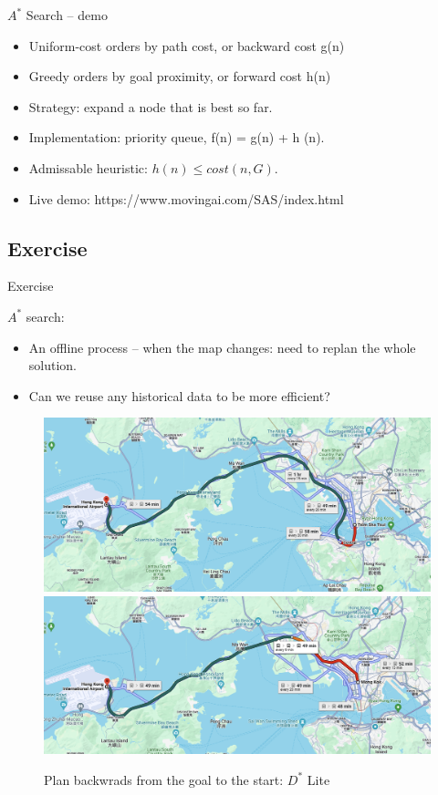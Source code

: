 \documentclass{beamer}
\begin{document}
\begin{frame}{$A^*$ Search -- demo}
\begin{itemize}
    \item Uniform-cost orders by path cost, or backward cost g(n)
    \item Greedy orders by goal proximity, or forward cost h(n)

    \item Strategy: expand a node that is best so far.
    
    \item Implementation: priority queue, f(n) = g(n) + h (n).

    \item Admissable heuristic: $h(n) \leq cost(n, G)$.

    \item \alert{Live demo: https://www.movingai.com/SAS/index.html}
\end{itemize}
\end{frame}




\subsection{Exercise}

\begin{frame}{Exercise}
    \begin{exampleblock}{$A^*$ search:}
        \begin{itemize}[<+-| alert@+>]
            \item An offline process -- when the map changes: need to replan the whole solution.

            \item Can we reuse any historical data to be more efficient?
        \end{itemize}
    \end{exampleblock}
    
    \pause
    \vspace{-5mm}
    \begin{figure}[htpb]
        \centering
        \includegraphics[width=0.5\linewidth]{pic/tst.png}
        \pause
        \includegraphics[width=0.5\linewidth]{pic/mongkok.png}
        \pause
        \vspace{-3mm}
        \caption{Plan backwrads from the goal to the start: $D^*$ Lite}
    \end{figure}
\end{frame}
\end{document}
